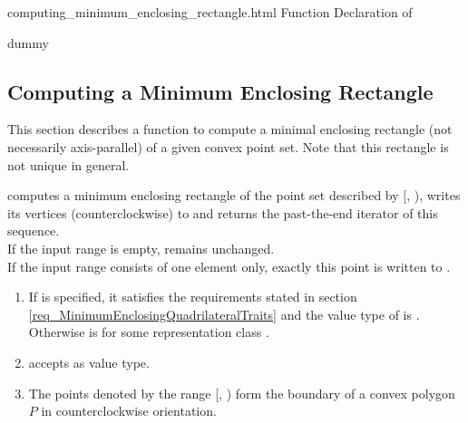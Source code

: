 \ccHtmlNoClassToc
\begin{ccHtmlClassFile}{computing_minimum_enclosing_rectangle.html}
  {Function Declaration of }
  \ccHtmlNoClassIndex\ccHtmlNoClassLinks
  \begin{ccClass}{dummy}
    \ccHtmlNoIndex\subsection{Computing a Minimum Enclosing Rectangle}
  \label{secMinimumEnclosingRectangle}
  \end{ccClass}
  
  This section describes a function to compute a minimal enclosing
  rectangle (not necessarily axis-parallel) of a given convex point
  set. Note that this rectangle is not unique in general.


  \def\ccLongParamLayout{\ccTrue} 
  
  
  computes a minimum enclosing rectangle of the point set described by
  [, ), writes its vertices
  (counterclockwise) to  and returns the past-the-end iterator
  of this sequence.\\
  If the input range is empty,  remains unchanged.\\
  If the input range consists of one element only,
  exactly this point is written to .\\
  
  \begin{enumerate}
  \item If  is specified, it satisfies the requirements
    stated in section \ref{req_MinimumEnclosingQuadrilateralTraits}
    and the value type  of  is
    . Otherwise  is
     for some representation class .
  \item {} accepts  as value type.
  \item The points denoted by the range [,
    ) form the boundary of a convex polygon $P$ in
    counterclockwise orientation.
  \end{enumerate}
  

\end{ccHtmlClassFile}
